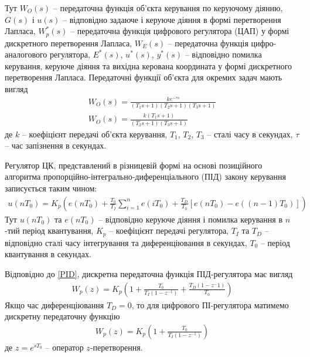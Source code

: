 Тут $W_O(s)$ -- передаточна функція об'єкта керування по керуючому діянню, $G(s)$ і $u(s)$ -- відповідно задаюче і керуюче діяння в формі
перетворення Лапласа, $W_p^*(s)$ -- передаточна функція цифрового регулятора (ЦАП) у формі дискретного перетворення Лапласа,
$W_E(s)$ -- передаточна функція цифро-аналогового регулятора, $E^*(s)$, $u^*(s)$, $y^*(s)$ -- відповідно помилка керування,
керуюче діяння та вихідна керована координата у формі дискретного перетворення Лапласа. Передаточні функції об'єкта для окремих задач мають вигляд
\begin{gather}\label{W_0}
    W_O(s) = \frac{
        k e^{-\tau s}
    }{
        (T_1 s + 1) (T_2 s + 1) (T_3 s + 1)
    } \\
    \label{W_0_12}
    W_O(s) = \frac{
        k (T_1 s + 1)
    }{
        (T_2 s + 1) (T_3 s + 1)
    }
\end{gather}
де $k$ -- коефіцієнт передачі об'єкта керування, $T_1$, $T_2$, $T_3$ -- сталі часу в секундах, $\tau$ -- час запізнення в секундах.

Регулятор ЦК, представлений в різницевій формі на основі позиційного алгоритма пропорційно-інтегрально-диференціального (ПІД)
закону керування записується таким чином:
\begin{gather}\label{PID}
    u(n T_0) = K_p \left(
        e(n T_0) + \frac{T_0}{T_I} \sum_{i=1}^n e(i T_0) +
        \frac{T_D}{T_0} \left[e(n T_0) - e((n-1)T_0)\right]
    \right)
\end{gather}
Тут $u(n T_0)$ та $e(n T_0)$ -- відповідно керуюче діяння і помилка керування в $n$-тий період квантування,
$K_p$ -- коефіцієнт передачі регулятора, $T_I$ та $T_D$ -- відповідно сталі часу інтегрування та диференціювання в секундах,
$T_0$ -- період квантування в секундах. 

Відповідно до \eqref{PID}, дискретна передаточна функція ПІД-регулятора має вигляд
\begin{gather}
    W_p(z) = K_p \left(
        1 + \frac{T_0}{T_I (1 - z^{-1})} + \frac{T_D(1 - z^-1)}{T_0}
    \right)
\end{gather}
Якщо час диференціювання $T_D = 0$, то для цифрового ПІ-регулятора матимемо дискретну передаточну функцію
\begin{gather}
    W_p(z) = K_p \left(
        1 + \frac{T_0}{T_I (1 - z^{-1})}
    \right)
\end{gather}
де $z = e^{sT_0}$ -- оператор $z$-перетворення.

